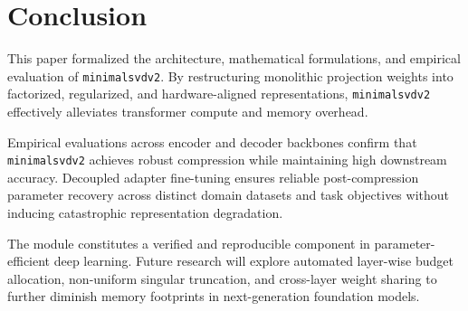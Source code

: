 \section{Conclusion}
This paper formalized the architecture, mathematical formulations, and empirical evaluation of \texttt{minimalsvdv2}. By restructuring monolithic projection weights into factorized, regularized, and hardware-aligned representations, \texttt{minimalsvdv2} effectively alleviates transformer compute and memory overhead.

Empirical evaluations across encoder and decoder backbones confirm that \texttt{minimalsvdv2} achieves robust compression while maintaining high downstream accuracy. Decoupled adapter fine-tuning ensures reliable post-compression parameter recovery across distinct domain datasets and task objectives without inducing catastrophic representation degradation.

The module constitutes a verified and reproducible component in parameter-efficient deep learning. Future research will explore automated layer-wise budget allocation, non-uniform singular truncation, and cross-layer weight sharing to further diminish memory footprints in next-generation foundation models.
